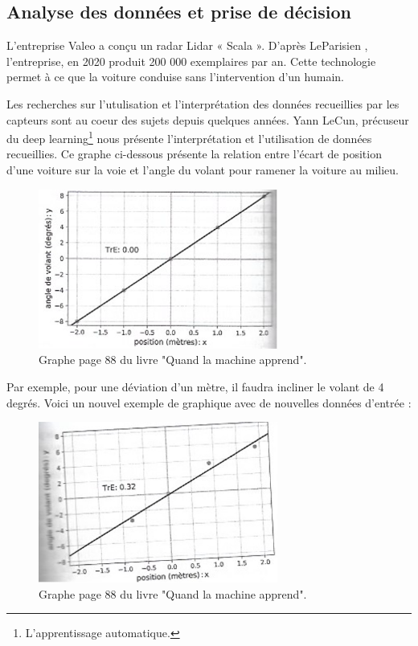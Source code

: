 \documentclass{article}
\begin{document}
\subsection{Analyse des données et prise de décision}
L'entreprise Valeo a conçu un radar Lidar « Scala ». D'après LeParisien \cite{le_parisien_radar_2019}, l'entreprise, en 2020 produit 200 000 exemplaires par an. Cette technologie permet à ce que la voiture conduise sans l'intervention d'un humain.


Les recherches sur l'utulisation et l'interprétation des données recueillies par les capteurs sont au coeur des sujets depuis quelques années. Yann LeCun, précuseur du deep learning\footnote{L'apprentissage automatique.} nous présente l'interprétation et l'utilisation de données recueillies.
Ce graphe ci-dessous présente la relation entre l’écart de position d’une voiture sur la voie et l’angle du volant pour ramener la voiture au milieu. 

\begin{figure}[h]
    \centering
    \includegraphics[width=0.7\textwidth]{images/graph1_yannLeCun.png} 
    \caption{Graphe page 88 du livre "Quand la machine apprend".}
\end{figure}

Par exemple, pour une déviation d’un mètre, il faudra incliner le volant de 4 degrés. 
Voici un nouvel exemple de graphique avec de nouvelles données d’entrée :

\begin{figure}[h]
    \centering
    \includegraphics[width=0.7\textwidth]{images/graph2_yannLeCun.jpg} 
    \caption{Graphe page 88 du livre "Quand la machine apprend".}
\end{figure}
\end{document}
